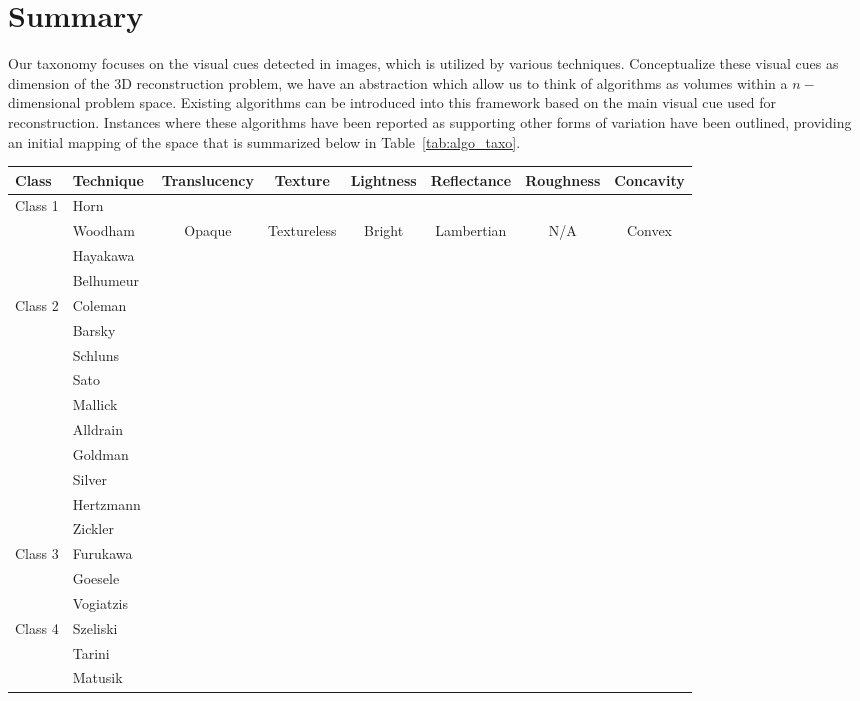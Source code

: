 \section{Summary}
Our taxonomy focuses on the visual cues detected in images, which is utilized by various techniques. Conceptualize these visual cues as dimension of the 3D reconstruction problem, we have an abstraction which allow us to think of algorithms as volumes within a $n-$dimensional problem space. Existing algorithms can be introduced into this framework based on the main visual cue used for reconstruction. Instances where these algorithms have been reported as supporting other forms of variation have been outlined, providing an initial mapping of the space that is summarized below in Table~\ref{tab:algo_taxo}.
\begin{sidewaystable}[h]
  \centering
  \begin{tabular}{*{2}{l}*{6}{c}}
  \hline
  \textbf{Class} & \textbf{Technique} & Translucency & Texture & Lightness & Reflectance & Roughness & Concavity\\
  \hline
  Class 1 & Horn~\cite{horn1970shape} \\
  & Woodham~\cite{woodham1980photometric} & Opaque & Textureless & Bright & Lambertian & N/A & Convex\\
  & Hayakawa~\cite{hayakawa1994photometric} \\
  & Belhumeur~\cite{belhumeur1999bas} \\
  \hline
  Class 2 & Coleman~\cite{coleman1982obtaining} \\
  & Barsky~\cite{barsky20034} \\
  & Schluns~\cite{schluns1993photometric} \\
  & Sato~\cite{sato1994temporal} \\
  & Mallick~\cite{mallick2005beyond} \\
  & Alldrain~\cite{alldrin2008photometric} \\
  & Goldman~\cite{goldman2010shape} \\
  & Silver~\cite{silver1980determining}\\
  & Hertzmann~\cite{hertzmann2005example} \\
  & Zickler~\cite{zickler2002helmholtz} \\
  \hline
  Class 3 & Furukawa~\cite{furukawa2010accurate} \\
  & Goesele~\cite{goesele2006multi} \\
  & Vogiatzis~\cite{vogiatzis2007multiview} \\
  \hline
  Class 4 & Szeliski~\cite{szeliski1993rapid} \\
  & Tarini~\cite{tarini2002marching} \\
  & Matusik~\cite{matusik2002efficient} \\
  \hline
  \end{tabular}
  \caption{Algorithm classification based on the new taxonomy}
  \label{tab:algo_taxo}
\end{sidewaystable}